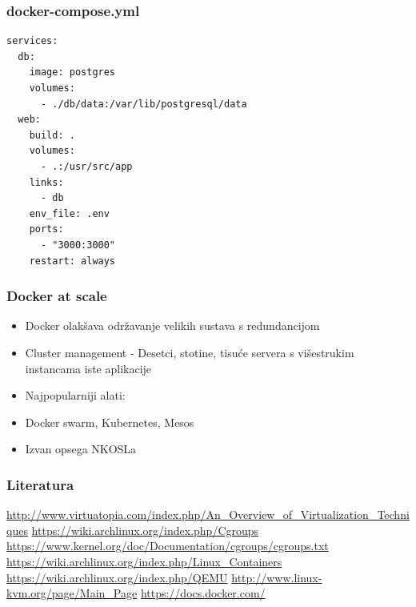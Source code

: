 \documentclass[t]{beamer}
\begin{document}
\begin{frame}[fragile]
	\frametitle{docker-compose.yml}

  \begin{verbatim}
services:
  db:
    image: postgres
    volumes:
      - ./db/data:/var/lib/postgresql/data
  web:
    build: .
    volumes:
      - .:/usr/src/app
    links:
      - db
    env_file: .env
    ports:
      - "3000:3000"
    restart: always
  \end{verbatim}

\end{frame}


\begin{frame}
	\frametitle{Docker at scale}

  \begin{itemize}
    \item Docker olakšava održavanje velikih sustava s redundancijom
    \item Cluster management - Desetci, stotine, tisuće servera s višestrukim instancama iste aplikacije
  \end{itemize}

  \begin{itemize}
    \item Najpopularniji alati:
    \item Docker swarm, Kubernetes, Mesos
    \item Izvan opsega NKOSLa
  \end{itemize}

\end{frame}


\begin{frame}
	\frametitle{Literatura}
	\url{http://www.virtuatopia.com/index.php/An_Overview_of_Virtualization_Techniques}
	\vfill
	\url{https://wiki.archlinux.org/index.php/Cgroups}\\
	\url{https://www.kernel.org/doc/Documentation/cgroups/cgroups.txt}
	\vfill
	\url{https://wiki.archlinux.org/index.php/Linux_Containers}
	\vfill
	\url{https://wiki.archlinux.org/index.php/QEMU}
	\vfill
	\url{http://www.linux-kvm.org/page/Main_Page}
  \vfill
  \url{https://docs.docker.com/}
\end{frame}
\end{document}
